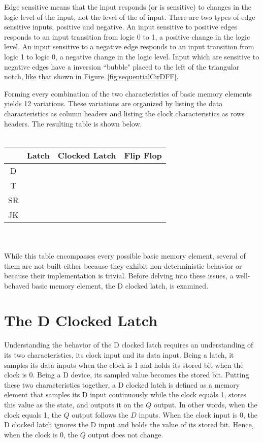 Edge sensitive means that the input responds (or is sensitive)
to changes in the logic level of the input, not the level of the
of input.  There are two types of edge sensitive inputs, positive
and negative.  An input sensitive to positive edges responds to an
input  transition from logic 0 to 1, a positive change in the logic
level.  An input sensitive to a negative edge responds to an input
transition from logic 1 to logic 0, a negative change in the logic
level.  Input which are sensitive to negative edges have a inversion
``bubble" placed to the left of the triangular notch, like that shown
in Figure~\ref{fig:sequentialCirDFF}.

Forming every combination of the two characteristics of basic
memory elements yields 12 variations.  These variations are
organized by listing the data characteristics as column
headers and listing the clock characteristics as rows headers.
The resulting table is shown below.
\\ \\
\begin{tabular}{|c|c|c|c|}\hline
&  Latch & Clocked Latch  & Flip Flop   \\ \hline
D  &        &      &    \\ \hline
T  &        &     &    \\ \hline
SR &        &      &    \\ \hline
JK &        &     &    \\ \hline
\end{tabular}
\\ \\
While this table encompasses every possible basic memory
element, several of them are not built either because they
exhibit non-deterministic behavior or because their implementation
is trivial.  Before delving into these issues, a well-behaved basic memory
element, the D clocked latch, is examined.

\section{The D Clocked Latch}
Understanding the behavior of the D clocked latch requires
an understanding of its two characteristics, its clock
input and its data input.  Being a latch, it samples its
data inputs when the clock is 1 and holds its stored bit
when the clock is 0.  Being a D device, its sampled value
becomes the stored bit. Putting these two characteristics
together, a D clocked latch is defined as a memory
element that samples its D input continuously while the clock
equals 1, stores this value as the state, and outputs it on
the $Q$ output.  In other words, when the clock equals 1, the
$Q$ output follows the $D$ inputs. When the clock input is 0,
the D clocked latch ignores the D input and holds the value
of its stored bit.  Hence, when the clock is 0, the
$Q$ output does not change.

